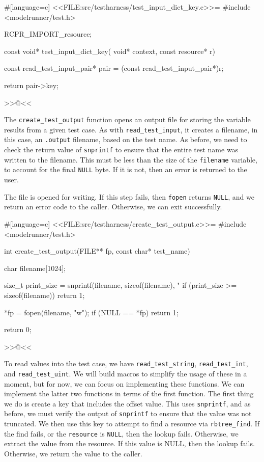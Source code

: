 {#[language=c]
<<FILE:src/testharness/test_input_dict_key.c>>=
#include <modelrunner/test.h>

RCPR_IMPORT_resource;

const void* test_input_dict_key(
    void* context, const resource* r)
{
    const read_test_input_pair* pair = (const read_test_input_pair*)r;

    return pair->key;
}
>>@<<

The \verb/create_test_output/ function opens an output file for storing the
variable results from a given test case.  As with \verb/read_test_input/, it
creates a filename, in this case, an \verb/.output/ filename, based on the test
name. As before, we need to check the return value of \verb/snprintf/ to ensure
that the entire test name was written to the filename. This must be less than
the size of the \verb/filename/ variable, to account for the final \verb/NULL/
byte. If it is not, then an error is returned to the user.

The file is opened for writing. If this step fails, then \verb/fopen/ returns
\verb/NULL/, and we return an error code to the caller.  Otherwise, we can exit
successfully.

#[language=c]
<<FILE:src/testharness/create_test_output.c>>=
#include <modelrunner/test.h>

int create_test_output(FILE** fp, const char* test_name)
{
    char filename[1024];

    size_t print_size =
        snprintf(filename, sizeof(filename), "%
    if (print_size >= sizeof(filename))
    {
        return 1;
    }

    *fp = fopen(filename, "w");
    if (NULL == *fp)
    {
        return 1;
    }

    return 0;
}
>>@<<

To read values into the test case, we have \verb/read_test_string/,
\verb/read_test_int/, and \verb/read_test_uint/. We will build macros to
simplify the usage of these in a moment, but for now, we can focus on
implementing these functions. We can implement the latter two functions in terms
of the first function. The first thing we do is create a key that includes the
offset value. This uses \verb/snprintf/, and as before, we must verify the
output of \verb/snprintf/ to ensure that the value was not truncated. We then
use this key to attempt to find a resource via \verb/rbtree_find/. If the find
fails, or the \verb/resource/ is \verb/NULL/, then the lookup fails. Otherwise,
we extract the value from the resource. If this value is NULL, then the lookup
fails.  Otherwise, we return the value to the caller.

}
